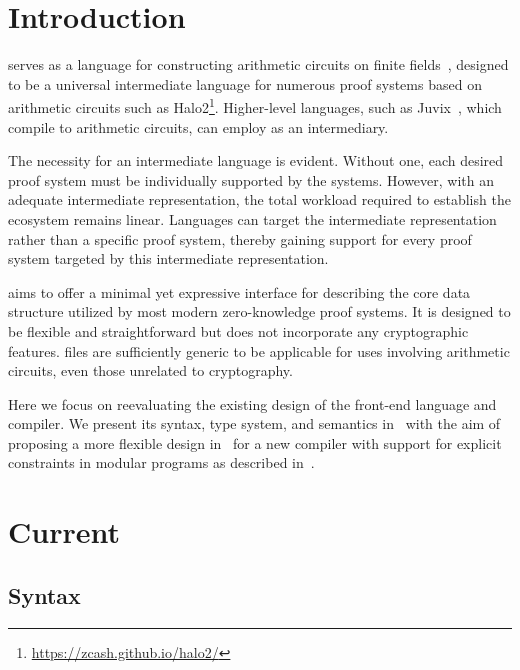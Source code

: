 \documentclass[
    9pt,            
    techreport,       
    affiltop,       
]{art}
\begin{document}
\maketitle
\tableofcontents

\section{Introduction}

\VampIR{} serves as a language for constructing arithmetic circuits on finite fields~\citep{anoma-vampir,vamp-ir-book}, designed to be a universal intermediate language for numerous proof systems based on arithmetic circuits such as Halo2\footnote{\url{https://zcash.github.io/halo2/}}. Higher-level languages, such as Juvix~\citep{anoma-juvix}, which compile to arithmetic circuits, can employ \VampIR{} as an intermediary.

The necessity for an intermediate language is evident. Without one, each desired proof system must be individually supported by the systems. However, with an adequate intermediate representation, the total workload required to establish the ecosystem remains linear. Languages can target the intermediate representation rather than a specific proof system, thereby gaining support for every proof system targeted by this intermediate representation.

\VampIR{} aims to offer a minimal yet expressive interface for describing the core data structure utilized by most modern zero-knowledge proof systems. It is designed to be flexible and straightforward but does not incorporate any cryptographic features. \VampIR{} files are sufficiently generic to be applicable for uses involving arithmetic circuits, even those unrelated to cryptography.

Here we focus on reevaluating the existing design of the \VampIR{} front-end language and compiler. We present its syntax, type system, and semantics in~ with the aim of proposing a more flexible design in~ for a new compiler with support for explicit constraints in modular \VampIR{} programs as described in~. 

\section{Current \VampIR{}}\label{sec:current-vampIR}


\subsection{Syntax}\label{sec:syntax}
\end{document}
